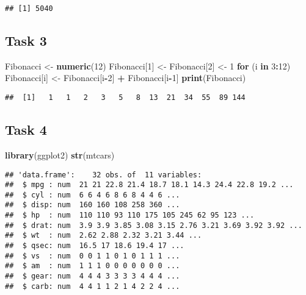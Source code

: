\documentclass[]{article}
\newenvironment{Shaded}{\begin{snugshade}}{\end{snugshade}}
\newcommand{\KeywordTok}[1]{\textcolor[rgb]{0.13,0.29,0.53}{\textbf{#1}}}
\newcommand{\DecValTok}[1]{\textcolor[rgb]{0.00,0.00,0.81}{#1}}
\newcommand{\StringTok}[1]{\textcolor[rgb]{0.31,0.60,0.02}{#1}}
\newcommand{\ControlFlowTok}[1]{\textcolor[rgb]{0.13,0.29,0.53}{\textbf{#1}}}
\newcommand{\OperatorTok}[1]{\textcolor[rgb]{0.81,0.36,0.00}{\textbf{#1}}}
\newcommand{\NormalTok}[1]{#1}
\begin{document}
\begin{verbatim}
## [1] 5040
\end{verbatim}

\subsection{Task 3}\label{task-3}

\begin{Shaded}
\begin{Highlighting}[]
\NormalTok{Fibonacci <-}\StringTok{ }\KeywordTok{numeric}\NormalTok{(}\DecValTok{12}\NormalTok{)}
\NormalTok{Fibonacci[}\DecValTok{1}\NormalTok{] <-}\StringTok{ }\NormalTok{Fibonacci[}\DecValTok{2}\NormalTok{] <-}\StringTok{ }\DecValTok{1}
\ControlFlowTok{for}\NormalTok{ (i }\ControlFlowTok{in} \DecValTok{3}\OperatorTok{:}\DecValTok{12}\NormalTok{) Fibonacci[i] <-}\StringTok{ }\NormalTok{Fibonacci[i}\OperatorTok{-}\DecValTok{2}\NormalTok{] }\OperatorTok{+}\StringTok{ }\NormalTok{Fibonacci[i}\OperatorTok{-}\DecValTok{1}\NormalTok{]}
\KeywordTok{print}\NormalTok{(Fibonacci)}
\end{Highlighting}
\end{Shaded}

\begin{verbatim}
##  [1]   1   1   2   3   5   8  13  21  34  55  89 144
\end{verbatim}

\subsection{Task 4}\label{task-4}

\begin{Shaded}
\begin{Highlighting}[]
\KeywordTok{library}\NormalTok{(ggplot2)}
\KeywordTok{str}\NormalTok{(mtcars)}
\end{Highlighting}
\end{Shaded}

\begin{verbatim}
## 'data.frame':    32 obs. of  11 variables:
##  $ mpg : num  21 21 22.8 21.4 18.7 18.1 14.3 24.4 22.8 19.2 ...
##  $ cyl : num  6 6 4 6 8 6 8 4 4 6 ...
##  $ disp: num  160 160 108 258 360 ...
##  $ hp  : num  110 110 93 110 175 105 245 62 95 123 ...
##  $ drat: num  3.9 3.9 3.85 3.08 3.15 2.76 3.21 3.69 3.92 3.92 ...
##  $ wt  : num  2.62 2.88 2.32 3.21 3.44 ...
##  $ qsec: num  16.5 17 18.6 19.4 17 ...
##  $ vs  : num  0 0 1 1 0 1 0 1 1 1 ...
##  $ am  : num  1 1 1 0 0 0 0 0 0 0 ...
##  $ gear: num  4 4 4 3 3 3 3 4 4 4 ...
##  $ carb: num  4 4 1 1 2 1 4 2 2 4 ...
\end{verbatim}
\end{document}
